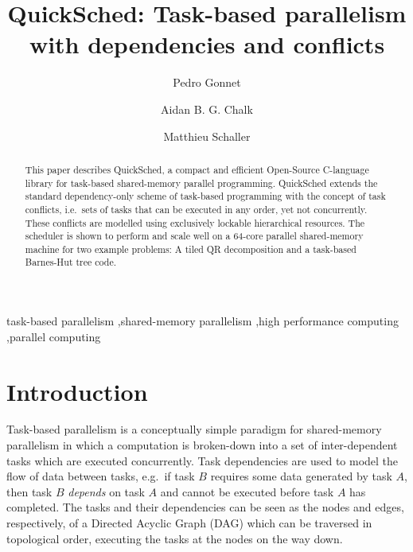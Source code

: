 \documentclass[preprint]{elsarticle}
\begin{document}
\title{QuickSched: Task-based parallelism with dependencies and conflicts}
\author[ecs,ggl]{Pedro Gonnet} 
\author[ecs]{Aidan B. G. Chalk} 
\author[icc]{Matthieu Schaller} 
\address[ecs]{School of Engineering and Computing Sciences, Durham University, South Road, Durham DH1 3LE, United Kingdom.}
\address[icc]{Institute for Computational Cosmology, Durham University, South Road, Durham DH1 3LE, United Kingdom.}
\address[ggl]{Google Switzerland GmbH, Brandshenkestr. 110, 8002 Z\"urich, Switzerland.}

\begin{abstract}
This paper describes QuickSched, a compact and efficient Open-Source
C-language library for task-based shared-memory parallel programming.
QuickSched extends the standard dependency-only scheme of task-based
programming with the concept of task conflicts, i.e.~sets of tasks
that can be executed in any order, yet not concurrently.
These conflicts are modelled using exclusively lockable
hierarchical resources.
The scheduler is shown to perform and scale well on a 64-core parallel
shared-memory machine for two example problems: A tiled QR
decomposition and a task-based Barnes-Hut tree code.
\end{abstract}

\begin{keyword}
    task-based parallelism \sep shared-memory parallelism \sep high performance computing \sep parallel computing
\end{keyword}

\maketitle


\section{Introduction}

Task-based parallelism is a conceptually simple paradigm for
shared-memory parallelism in which a computation is broken-down
into a set of inter-dependent tasks which are executed
concurrently.
Task dependencies are used to model the flow of data between
tasks, e.g.~if task $B$ requires some data generated by task $A$,
then task $B$ {\em depends} on task $A$ and cannot be executed
before task $A$ has completed.
The tasks and their dependencies can be seen as the nodes and edges,
respectively, of a Directed Acyclic Graph (DAG) which can be
traversed in topological order, executing the tasks at the nodes
on the way down.
\end{document}
